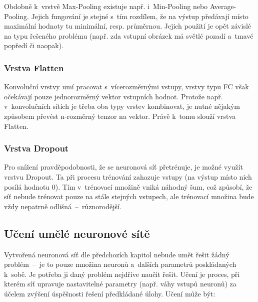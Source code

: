 \documentclass[a4paper,12pt]{article}
\begin{document}
{{{{{{{Obdobně k~vrstvě Max-Pooling existuje např. i~Min-Pooling nebo Average-Pooling. Jejich fungování je stejné s~tím rozdílem, že na výstup předávají místo maximální hodnoty tu minimální, resp. průměrnou. Jejich použití je opět závislé na typu řešeného problému (např. zda vstupní obrázek má světlé pozadí a~tmavé popředí či naopak).~\cite{keras}

\subsubsection{Vrstva Flatten}

Konvoluční vrstvy umí pracovat s~vícerozměrnými vstupy, vrstvy typu FC však očekávají pouze jednorozměrný vektor vstupních hodnot. Protože např. v~konvolučních sítích je třeba oba typy vrstev kombinovat, je nutné nějakým způsobem převést n-rozměrný tenzor na vektor. Právě k~tomu slouží vrstva Flatten.~\cite{keras}

\drawgimp

\subsubsection{Vrstva Dropout}

Pro snížení pravděpodobnosti, že se neuronová síť přetrénuje, je možné využít vrstvu Dropout. Ta při procesu trénování zahazuje vstupy (na výstup místo nich posílá hodnotu 0). Tím v~trénovací množině vniká náhodný šum, což způsobí, že síť nebude trénovat pouze na stále stejných vstupech, ale trénovací množina bude vždy nepatrně odlišná~--~různorodější.~\cite{keras}


{

\subsection{Učení umělé neuronové sítě}

Vytvořená neuronová síť dle předchozích kapitol nebude umět řešit žádný problém~--~je to pouze množina neuronů a~dalších parametrů poskládaných k~sobě. Je potřeba ji daný problém nejdříve naučit řešit. Učení je proces, při kterém síť upravuje nastavitelné parametry (např. váhy vstupů neuronů) za účelem zvýšení úspěšnosti řešení předkládané úlohy. Učení může být:


}}}}}}}}
\end{document}
